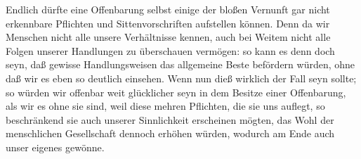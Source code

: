 \begin{aufza}
\item Endlich dürfte eine Offenbarung selbst einige  der bloßen Vernunft gar nicht erkennbare Pflichten und Sittenvorschriften aufstellen können. Denn da wir Menschen nicht alle unsere Verhältnisse kennen, auch bei Weitem nicht alle Folgen unserer Handlungen zu überschauen vermögen: so kann es denn doch seyn, daß gewisse Handlungsweisen das allgemeine Beste befördern würden, ohne daß wir es eben so deutlich einsehen. Wenn nun dieß wirklich der Fall seyn sollte; so würden wir offenbar weit glücklicher seyn in dem Besitze einer Offenbarung, als wir es ohne sie sind, weil diese mehren Pflichten, die sie uns auflegt, so beschränkend sie auch unserer Sinnlichkeit erscheinen mögten, das Wohl der menschlichen Gesellschaft dennoch erhöhen würden, wodurch am Ende auch unser eigenes gewönne.
\end{aufza}
   

